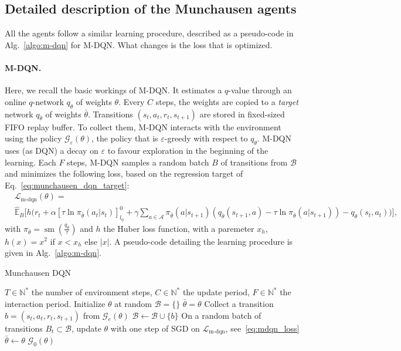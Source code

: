 \documentclass{article}
\newcommand{\gr}{\mathcal{G}}
\DeclareMathOperator*{\softmax}{sm}
\newcommand{\actions}{\mathcal{A}}
\newcommand{\abs}[1]{\left\lvert#1\right\rvert}
\begin{document}
\subsection{Detailed description of the Munchausen agents}
\label{subappx:m-agent}
All the agents follow a similar learning procedure, described as a pseudo-code in Alg.~\ref{algo:m-dqn} for M-DQN. What changes is the loss that is optimized.

\paragraph{M-DQN.} Here, we  recall the basic workings of M-DQN. It estimates a $q$-value through an online $q$-network $q_\theta$ of weights $\theta$. Every $C$ steps, the weights are copied to a \emph{target} network $q_{\bar\theta}$ of weights $\bar\theta$. Transitions $(s_t, a_t, r_t, s_{t+1})$ are stored in fixed-sized FIFO replay buffer. To collect them, M-DQN interacts with the environment using the policy $\gr_{\varepsilon}(\theta)$, the policy that is $\varepsilon$-greedy with respect to $q_\theta$. M-DQN uses (as DQN) a decay on $\varepsilon$ to favour exploration in the beginning of the learning. Each $F$ steps, M-DQN samples a random batch  $B$ of transitions from $\mathcal{B}$ and minimizes the following loss, based on the regression target of Eq.~\eqref{eq:munchausen_dqn_target}:
\begin{align}
\label{eq:mdqn_loss}
    &\mathcal{L}_{\text{m-dqn}}(\theta) =
    \\
    &\hat{\mathbb{E}}_B \Bigg[h\Big(r_t + \alpha\left[\tau\ln\pi_{\bar\theta}(a_t|s_t)\right]_{l_0}^0 + \gamma\sum_{a\in\actions}\pi_{\bar\theta}(a|s_{t+1})\left(q_{\bar\theta}(s_{t+1},a) - \tau\ln\pi_{\bar\theta}(a|s_{t+1})\right) 
    -  q_\theta(s_t,a_t)\Big)\Bigg],
\end{align}
with $\pi_{\bar\theta} = \softmax(\frac{q_{\bar\theta}}{\tau})$ and $h$ the Huber loss function, with a paremeter $x_h$, $h(x) = x^2$ if   $x < x_h$ else $\abs{x}$. A pseudo-code detailing the learning procedure is given in Alg.~\ref{algo:m-dqn}. 

\begin{algorithm}[tbh]
\caption{Munchausen DQN }
\begin{algorithmic}\label{algo:m-dqn}
\REQUIRE $T\in \mathbb{N^*}$ the number of environment steps, $C\in \mathbb{N^*}$ the update period, $F \in \mathbb{N^*}$ the interaction period.
\STATE Initialize $\theta$ at random
\STATE $\mathcal{B} = \{\}$
\STATE $\bar\theta = \theta$
    \STATE Collect a transition $b = (s_t, a_t, r_t, s_{t+1})$ from $\gr_e(\theta)$
    \STATE $\mathcal{B} \leftarrow \mathcal{B} \cup \{b\}$
        \STATE On a random batch of transitions $B_{t} \subset \mathcal{B}$, update $\theta$ with one step of SGD on $\mathcal{L}_{\text{m-dqn}}$, see~\eqref{eq:mdqn_loss} 
    \ENDIF
        \STATE $\bar\theta \leftarrow \theta$
    \ENDIF
\ENDFOR
\RETURN $\gr_0(\theta)$
\end{algorithmic}
\end{algorithm}
\end{document}
